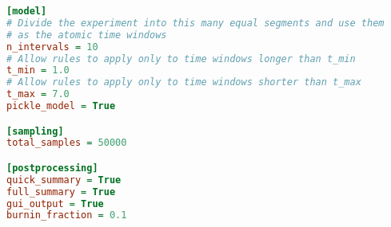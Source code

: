 \documentclass[12pt]{report}
\begin{document}
\begin{lstlisting}[language=Ini,caption=Template MITRE configuration file,numbers=none]
[model]
# Divide the experiment into this many equal segments and use them
# as the atomic time windows
n_intervals = 10
# Allow rules to apply only to time windows longer than t_min
t_min = 1.0
# Allow rules to apply only to time windows shorter than t_max
t_max = 7.0
pickle_model = True

[sampling] 
total_samples = 50000

[postprocessing]
quick_summary = True
full_summary = True
gui_output = True
burnin_fraction = 0.1
\end{lstlisting}
\end{document}

